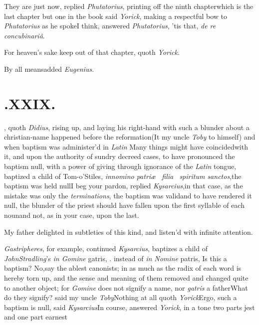 \documentclass{article}
\begin{document}
They are just now, replied \textit{Phutatorius}, printing off the
ninth chapter\tsk which is the last chapter but one in the
book\tsk{} said
\textit{Yorick}, making a respectful bow to \textit{Phutatorius} as he
spoke\tsk I think, answered \textit{Phutatorius},
’tis that, \textit{de re concubinariâ}.

For heaven’s sake keep out of that chapter, quoth
\textit{Yorick}.

\tsh By all means\tsk added \textit{Eugenius}.

\bigskip
\section{.\enspace XXIX.}

, quoth \textit{Didius},
rising up, and laying his right-hand with 
such a blunder about a christian-name
happened before the reformation\tsk (It 
my uncle \textit{Toby} to himself) and when\break
baptism was administer’d in
\textit{Latin}\tsh\break
{}\break
\tsk Many things might have coincided\break with it, and
upon the authority of sundry decreed cases, to have pronounced the
baptism null, with a power of giving
through ignorance of the \textit{Latin} tongue, baptized a child of
Tom-o’Stiles, \textit{in\break nomino patriæ \et\ filia \et\
spiritum sanctos},\break\tsk the baptism was held
null\tsk I beg your pardon, replied
\textit{Kysarcius},\tsk in that case, as the mistake was only
the \textit{terminations}, the baptism was valid\tsh and to
have rendered it null, the blunder of the priest should have fallen
upon the first syllable of each noun\tsh and not, as in
your case, upon the last.\tsk

My father delighted in subtleties of this kind, and
listen’d with infinite attention.

\textit{Gastripheres}, for example, continued \textit{Kysarcius},
baptizes a child of \textit{John\break Stradling}’s \textit{in Gomine}
gatris, \etc \et{\itshape c}.\catch{instead} instead of \textit{in Nomine} patris,
\etc\tsk Is this\break
a baptism? No,\tsk say the ablest cano\-nists; in as much as the radix of each word is hereby torn up,
and the sense\break
and meaning of them removed and\break
changed quite to another object; for\break
\textit{Gomine} does not signify a name, nor\break
\textit{gatris} a father\tsk What do they signify?\break
said my uncle \textit{Toby}\tsk Nothing at all\tsk\break
quoth \textit{Yorick}\tsk Ergo, such a baptism is\break
null, said \textit{Kysarcius}\tsk In course, answered\break
\textit{Yorick}, in a tone two parts jest and one\break
part earnest\tsk
\end{document}
